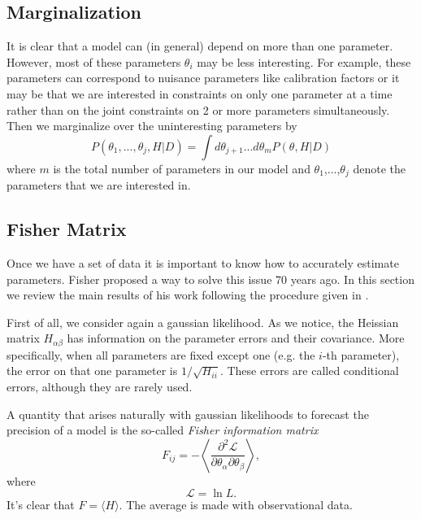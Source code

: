 \documentclass[onecolumn,           %
               showpacs,            %
               preprintnumbers,     %
               aps,                 %
               letterpaper,             %
               superscriptaddress,      %
               nofootinbib,         %
               tightenlines,        %
               floats,floatfix      %
               ,usenatbib,
               ]{revtex4-1}
\begin{document}
\subsection{Marginalization}

It is clear that a model can (in general) depend on more than one parameter. However, most of these parameters $\theta_i$ may be less interesting. For example, these parameters can correspond to nuisance parameters like calibration factors or it may be that we are interested in constraints on only one parameter at a time rather than on the joint constraints on 2 or more parameters simultaneously. Then we marginalize over the uninteresting parameters by
\begin{equation}
P(\theta_1,...,\theta_j,H|D)=\int d\theta_{j+1}...d\theta_{m}P(\theta,H|D)
\end{equation}
where $m$ is the total number of parameters in our model and $\theta_1$,...,$\theta_j$ denote the parameters that we are interested in.

\subsection{Fisher Matrix}

Once we have a set of data it is important to know how to accurately estimate parameters. Fisher \cite{Fisher} proposed a way to solve this issue 70 years ago. In this section we review the main results of his work following the procedure given in \cite{LiV}.

First of all, we consider again a gaussian likelihood. As we notice, the Heissian matrix $H_{\alpha\beta}$ has information on the parameter errors and their covariance. More specifically, when all parameters are fixed except one (e.g. the $i$-th parameter), the error on that one parameter is $1/\sqrt{H_{ii}}$. These errors are called conditional errors, although they are rarely used.

A quantity that arises naturally with gaussian likelihoods to forecast the precision of a model is the so-called \textit{Fisher information matrix}
\begin{equation}
F_{ij}=-\left\langle \frac{\partial^2 \mathcal{L}}{\partial \theta_\alpha \partial \theta_\beta}\right\rangle,
\end{equation}
where 
\begin{equation}
\mathcal{L}=\ln L.
\end{equation}
It's clear that $F=\langle H\rangle$. The average is made with observational data. 
\end{document}

